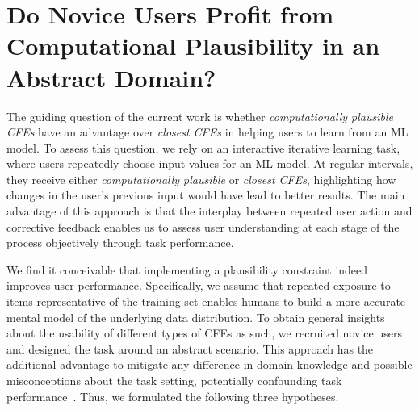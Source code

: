 
\section{Do Novice Users Profit from Computational Plausibility in an Abstract Domain?}\label{sec:hypotheses}


The guiding question of the current work is whether \textit{computationally plausible \glspl{CFE}} have an advantage over \textit{closest \glspl{CFE}} in helping users to learn from an \gls{ML} model.
To assess this question, we rely on an interactive iterative learning task, where users repeatedly choose input values for an \gls{ML} model.
At regular intervals, they receive either \textit{computationally plausible} or \textit{closest \glspl{CFE}}, highlighting how changes in the user's previous input would have lead to better results.
The main advantage of this approach is that the interplay between repeated user action and corrective feedback enables us to assess user understanding at each stage of the process objectively through task performance.

We find it conceivable that implementing a plausibility constraint indeed improves user performance. 
Specifically, we assume that repeated exposure to items representative of the training set enables humans to build a more accurate mental model of the underlying data distribution.
To obtain general insights about the usability of different types of \glspl{CFE} as such, we recruited novice users and designed the task around an abstract scenario.
This approach has the additional advantage to mitigate any difference in domain knowledge and possible misconceptions about the task setting, potentially confounding task performance~\citep{van_der_waa_evaluating_2021}.
Thus, we formulated the following three hypotheses.

